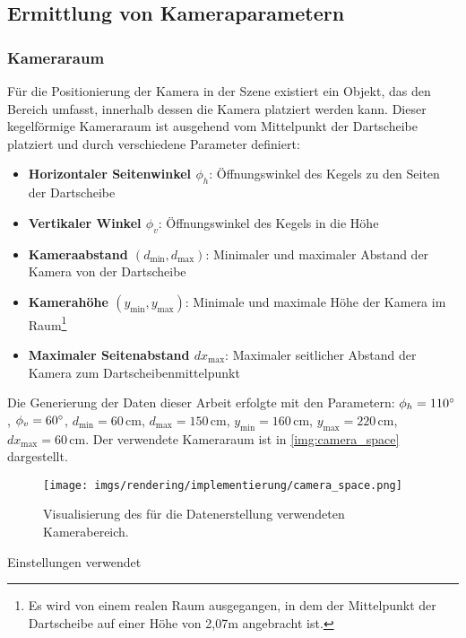 \subsection{Ermittlung von Kameraparametern}  %
\label{sec:ermittlung_kameraparamater}

\subsubsection{Kameraraum}

Für die Positionierung der Kamera in der Szene existiert ein Objekt, das den Bereich umfasst, innerhalb dessen die Kamera platziert werden kann. Dieser kegelförmige Kameraraum ist ausgehend vom Mittelpunkt der Dartscheibe platziert und durch verschiedene Parameter definiert:

\begin{itemize}
    \item \textbf{Horizontaler Seitenwinkel $\phi_h$}: Öffnungswinkel des Kegels zu den Seiten der Dartscheibe
    \item \textbf{Vertikaler Winkel $\phi_v$}: Öffnungswinkel des Kegels in die Höhe
    \item \textbf{Kameraabstand $\left(d_\text{min}, d_\text{max}\right)$}: Minimaler und maximaler Abstand der Kamera von der Dartscheibe
    \item \textbf{Kamerahöhe $\left(y_\text{min}, y_\text{max}\right)$}: Minimale und maximale Höhe der Kamera im Raum\footnote{Es wird von einem realen Raum ausgegangen, in dem der Mittelpunkt der Dartscheibe auf einer Höhe von 2,07m angebracht ist.}
    \item \textbf{Maximaler Seitenabstand $dx_\text{max}$}: Maximaler seitlicher Abstand der Kamera zum Dartscheibenmittelpunkt
\end{itemize}

Die Generierung der Daten dieser Arbeit erfolgte mit den Parametern: $\phi_h = 110^{\circ}$, $\phi_v = 60^{\circ}$, $d_\text{min} = 60\,\text{cm}$, $d_\text{max} = 150\,\text{cm}$, $y_\text{min} = 160\,\text{cm}$, $y_\text{max} = 220\,\text{cm}$, $dx_\text{max} = 60\,\text{cm}$. Der verwendete Kameraraum ist in \autoref{img:camera_space} dargestellt.

\begin{figure}
    \centering
    \texttt{[image: imgs/rendering/implementierung/camera\_space.png]}
    \caption{Visualisierung des für die Datenerstellung verwendeten Kamerabereich.}
    \label{img:camera_space}
\end{figure} Einstellungen verwendet

